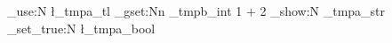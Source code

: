 \tl_use:N
  \l_tmpa_tl
\int_gset:Nn
  \g_tmpb_int
  { 1 + 2 }
\str_show:N
  \g_tmpa_str
\bool_set_true:N
  \l_tmpa_bool
